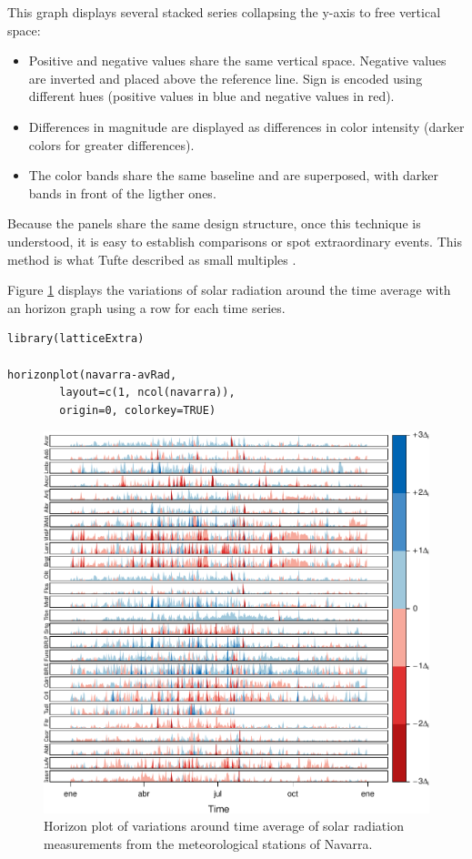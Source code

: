 This graph displays several stacked series collapsing the y-axis
to free vertical space:
\begin{itemize}
\item Positive and negative values share the same vertical
space. Negative values are inverted and placed above the
reference line. Sign is encoded using different hues (positive
values in blue and negative values in red).
\item Differences in magnitude are displayed as differences in color
intensity (darker colors for greater differences).
\item The color bands share the same baseline and are superposed, with
darker bands in front of the ligther ones.
\end{itemize}

Because the panels share the same design structure, once this
technique is understood, it is easy to establish comparisons or spot
extraordinary events.  This method is what Tufte described as small
multiples \cite{Tufte1990}.

Figure \ref{fig:navarraHorizonplot} displays the variations of
solar radiation around the time average with an horizon graph
using a row for each time series.


\lstset{language=R,numbers=none}
\begin{lstlisting}
library(latticeExtra)

horizonplot(navarra-avRad,
	    layout=c(1, ncol(navarra)),
	    origin=0, colorkey=TRUE)
\end{lstlisting}

\begin{figure}[htb]
\centering
\includegraphics[width=.9\linewidth]{figs/navarraHorizonplot.pdf}
\caption{\label{fig:navarraHorizonplot}Horizon plot of variations around time average of solar radiation measurements from the meteorological stations of Navarra.}
\end{figure}

